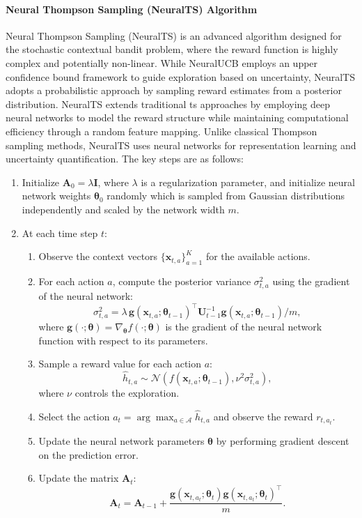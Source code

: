 \paragraph{Neural Thompson Sampling (NeuralTS) Algorithm} 

Neural Thompson Sampling (NeuralTS) \citep{zhang2021neural} is an advanced algorithm designed for the stochastic contextual bandit problem, where the reward function is highly complex and potentially non-linear.
While NeuralUCB employs an upper confidence bound framework to guide exploration based on uncertainty, NeuralTS adopts a probabilistic approach by sampling reward estimates from a posterior distribution. NeuralTS extends traditional \acl{ts} approaches by employing deep neural networks to model the reward structure while maintaining computational efficiency through a random feature mapping. Unlike classical Thompson sampling methods, NeuralTS uses neural networks for representation learning and uncertainty quantification. The key steps are as follows:  
\begin{enumerate}  
    \item Initialize $\mathbf{A}_0 = \lambda \mathbf{I}$, where $\lambda$ is a regularization parameter, and initialize neural network weights $\boldsymbol{\theta}_0$ randomly which is sampled from Gaussian distributions independently and scaled by the network width \(m\).  
    \item At each time step \(t\):  
    \begin{enumerate}  
        \item Observe the context vectors $\{\mathbf{x}_{t,a}\}_{a=1}^K$ for the available actions.  
        \item For each action \(a\), compute the posterior variance $\sigma^2_{t,a}$ using the gradient of the neural network:  
        \[  
        \sigma^2_{t,a} = \lambda \, \mathbf{g}(\mathbf{x}_{t,a}; \boldsymbol{\theta}_{t-1})^\top \mathbf{U}_{t-1}^{-1} \mathbf{g}(\mathbf{x}_{t,a}; \boldsymbol{\theta}_{t-1}) / m,  
        \]  
        where $\mathbf{g}(\cdot; \boldsymbol{\theta}) = \nabla_{\boldsymbol{\theta}} f(\cdot; \boldsymbol{\theta})$ is the gradient of the neural network function with respect to its parameters.  
        \item Sample a reward value for each action \(a\):  
        \[  
        \hat{h}_{t,a} \sim \mathcal{N}(f(\mathbf{x}_{t,a}; \boldsymbol{\theta}_{t-1}), \nu^2 \sigma^2_{t,a}),  
        \]  
        where \(\nu\) controls the exploration.  
        \item Select the action \(a_t = \arg\max_{a \in \mathcal{A}} \hat{h}_{t,a}\) and observe the reward \(r_{t,a_t}\).  
        \item Update the neural network parameters \(\boldsymbol{\theta}\) by performing gradient descent on the prediction error.  
        \item Update the matrix $\mathbf{A}_t$:  
        \[  
        \mathbf{A}_t = \mathbf{A}_{t-1} + \frac{\mathbf{g}(\mathbf{x}_{t,a_t}; \boldsymbol{\theta}_t) \mathbf{g}(\mathbf{x}_{t,a_t}; \boldsymbol{\theta}_t)^\top}{m}.  
        \]  
    \end{enumerate}  
\end{enumerate}  
 
